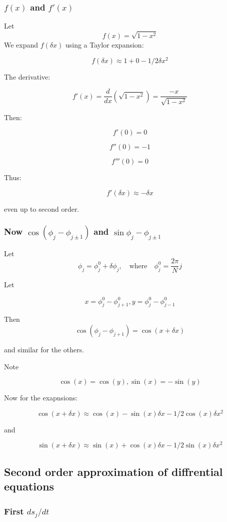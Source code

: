 \documentclass{article}
\begin{document}
\subsubsection{$f(x)$ and $f'(x)$}
Let 
\[
f(x) = \sqrt{1 - x^2}
\]
We expand \( f(\delta x) \) using a Taylor expansion:

\[
\boxed{f(\delta x) \approx 1 + 0 - 1/2 \delta x^2}
\]

The derivative:

\[
f'(x) = \frac{d}{dx} \left( \sqrt{1 - x^2} \right) = \frac{-x}{\sqrt{1 - x^2}}
\]

Then:

\[
f'(0) = 0
\]

\[
f''(0) = -1
\]

\[
f'''(0) = 0
\]

Thus:

\[
\boxed{f'(\delta x) \approx -\delta x}
\]

even up to second order.

\subsubsection{Now $\cos(\phi_j - \phi_{j\pm1})$ and $\sin{\phi_j - \phi_{j\pm1}}$}

Let
\[
\phi_j = \phi_j^0 + \delta \phi_j, \quad \text{where} \quad \phi_j^0 = \frac{2\pi}{N} j
\]

Let 

\[
x = \phi_j^0 - \phi_{j+1}^0, y = \phi_j^0 - \phi_{j-1}^0
\]

Then 
\[
    \cos(\phi_j - \phi_{j+1}) = \cos(x + \delta x)
\]

and similar for the others.

Note

\[
\cos(x) = \cos(y), \sin(x) = -\sin(y)
\]

Now for the exapnsions:

\[
    \boxed{\cos(x + \delta x) \approx \cos(x) - \sin(x)\delta x - 1/2\cos(x)\delta x^2}
\]

and 

\[
    \boxed{\sin(x + \delta x) \approx \sin(x) + \cos(x)\delta x - 1/2\sin(x)\delta x^2}
\]

\subsection{Second order approximation of diffrential equations}

\subsubsection{First $ds_j/dt$}
\end{document}
